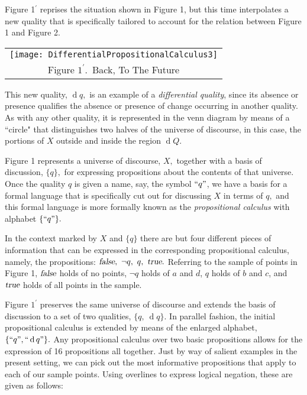 \documentclass[12pt]{article}
\begin{document}
Figure 1$^\prime$ reprises the situation shown in Figure 1, but this time interpolates a new quality that is specifically tailored to account for the relation between Figure 1 and Figure 2.

\begin{center}\begin{tabular}{c}
\texttt{[image: DifferentialPropositionalCalculus3]}
\\
Figure $1^\prime.$\ Back, To The Future
\end{tabular}\end{center}

This new quality, $\operatorname{d}q,$ is an example of a \textit{differential quality}, since its absence or presence qualifies the absence or presence of change occurring in another quality.  As with any other quality, it is represented in the venn diagram by means of a ``circle" that distinguishes two halves of the universe of discourse, in this case, the portions of $X$ outside and inside the region $\operatorname{d}Q.$

Figure 1 represents a universe of discourse, $X,$ together with a basis of discussion, $\{ q \},$ for expressing propositions about the contents of that universe.  Once the quality $q$ is given a name, say, the symbol $``q"$, we have a basis for a formal language that is specifically cut out for discussing $X$ in terms of $q,$ and this formal language is more formally known as the \textit{propositional calculus} with alphabet $\{ ``q" \}.$

In the context marked by $X$ and $\{ q \}$ there are but four different pieces of information that can be expressed in the corresponding propositional calculus, namely, the propositions: $\textsl{false},\ \lnot q,\ q,\ \textsl{true}.$  Referring to the sample of points in Figure 1, $\textsl{false}$ holds of no points, $\lnot q$ holds of $a$ and $d$, $q$ holds of $b$ and $c$, and $\textsl{true}$ holds of all points in the sample.

Figure $1^\prime$ preserves the same universe of discourse and extends the basis of discussion to a set of two qualities, $\{ q,\ \operatorname{d}q \}.$  In parallel fashion, the initial propositional calculus is extended by means of the enlarged alphabet, $\{ ``q", ``\operatorname{d}q" \}.$  Any propositional calculus over two basic propositions allows for the expression of 16 propositions all together.  Just by way of salient examples in the present setting, we can pick out the most informative propositions that apply to each of our sample points.  Using overlines to express logical negation, these are given as follows:
\end{document}
